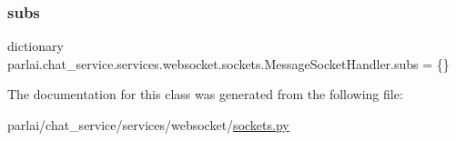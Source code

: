 \subsubsection{\texorpdfstring{subs}{subs}}
{\footnotesize\ttfamily dictionary parlai.\+chat\+\_\+service.\+services.\+websocket.\+sockets.\+Message\+Socket\+Handler.\+subs = \{\}\hspace{0.3cm}{\ttfamily [static]}}



The documentation for this class was generated from the following file\+:\begin{DoxyCompactItemize}
\item 
parlai/chat\+\_\+service/services/websocket/\hyperlink{sockets_8py}{sockets.\+py}\end{DoxyCompactItemize}
